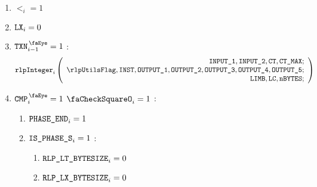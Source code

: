 \begin{center}
\end{center}
\begin{enumerate}
    \item $\lt_{i} =1$
    \item $\texttt{LX}_{i} =0$
    \item \If $\isTxn_{i-1} =1$ \Then:
        \[
            \rlpInteger_{i}
            \left(
            \begin{array}{r}
                \inputColumn{1},
                \inputColumn{2},
                \ct,
                \maxCt; \\
                \rlpUtilsFlag,
                \INST,
                \resultColumn{1},
                \resultColumn{2},
                \resultColumn{3},
                \resultColumn{4},
                \resultColumn{5}; \\
                \limb,
                \lc,
                \limbsize; \\
            \end{array}
            \right)
        \]
    \item \If $\isCmp_{i} =1$ \et $\done_{i}=1$ \Then:
        \begin{enumerate}
            \item $\texttt{PHASE\_END}_{i}=1$
            \item \If $\texttt{IS\_PHASE\_S}_{i}=1$ \Then:
                \begin{enumerate}
                    \item $\texttt{RLP\_LT\_BYTESIZE}_{i} = 0$
                    \item $\texttt{RLP\_LX\_BYTESIZE}_{i} = 0$ 
                \end{enumerate}
        \end{enumerate}
\end{enumerate}
